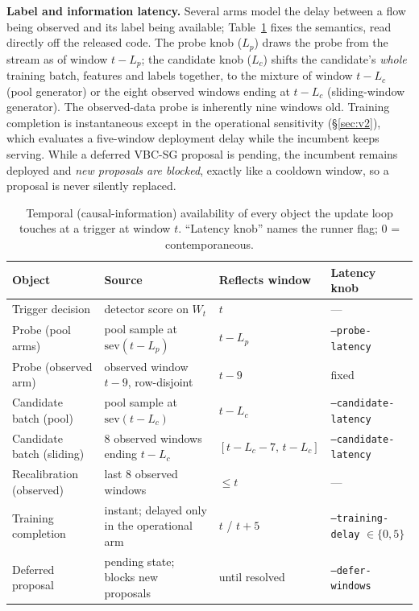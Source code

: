 \documentclass[a4paper,fleqn]{cas-sc}
\begin{document}
\textbf{Label and information latency.} Several arms model the delay between a flow being observed and its label being available; Table~\ref{tab:latency} fixes the semantics, read directly off the released code. The probe knob ($L_p$) draws the probe from the stream as of window $t-L_p$; the candidate knob ($L_c$) shifts the candidate's \emph{whole} training batch, features and labels together, to the mixture of window $t-L_c$ (pool generator) or the eight observed windows ending at $t-L_c$ (sliding-window generator). The observed-data probe is inherently nine windows old. Training completion is instantaneous except in the operational sensitivity (\S\ref{sec:v2}), which evaluates a five-window deployment delay while the incumbent keeps serving. While a deferred VBC-SG proposal is pending, the incumbent remains deployed and \emph{new proposals are blocked}, exactly like a cooldown window, so a proposal is never silently replaced.

\begin{table}[t]
\centering
\caption{Temporal (causal-information) availability of every object the update loop touches at a trigger at window $t$. ``Latency knob'' names the runner flag; 0 = contemporaneous.}
\label{tab:latency}
\footnotesize
\setlength{\tabcolsep}{3.5pt}
\begin{tabular}{l l l l}
\toprule
Object & Source & Reflects window & Latency knob \\
\midrule
Trigger decision & detector score on $W_t$ & $t$ & --- \\
Probe (pool arms) & pool sample at $\mathrm{sev}(t-L_p)$ & $t-L_p$ & \texttt{--probe-latency} \\
Probe (observed arm) & observed window $t-9$, row-disjoint & $t-9$ & fixed \\
Candidate batch (pool) & pool sample at $\mathrm{sev}(t-L_c)$ & $t-L_c$ & \texttt{--candidate-latency} \\
Candidate batch (sliding) & 8 observed windows ending $t-L_c$ & $[t-L_c-7,\, t-L_c]$ & \texttt{--candidate-latency} \\
Recalibration (observed) & last 8 observed windows & $\le t$ & --- \\
Training completion & instant; delayed only in the operational arm & $t$ / $t{+}5$ & \texttt{--training-delay} $\in\{0,5\}$ \\
Deferred proposal & pending state; blocks new proposals & until resolved & \texttt{--defer-windows} \\
\bottomrule
\end{tabular}
\end{table}
\end{document}
